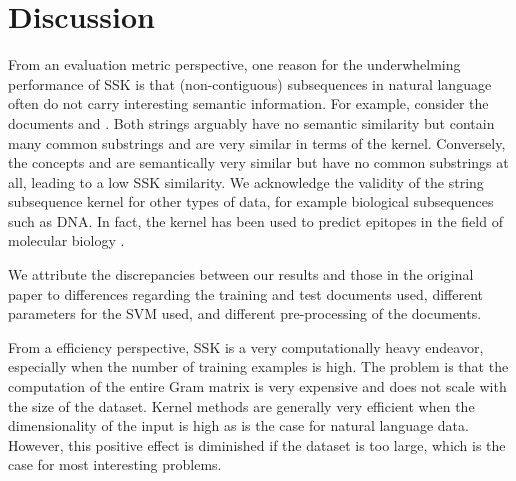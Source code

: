 \section{Discussion} \label{sec:discussion}

From an evaluation metric perspective, one reason for the underwhelming performance of SSK is that (non-contiguous) subsequences in natural language often do not carry interesting semantic information. For example, consider the documents  and . Both strings arguably have no semantic similarity but contain many common substrings and are very similar in terms of the kernel. Conversely, the concepts  and  are semantically very similar but have no common substrings at all, leading to a low SSK similarity. We acknowledge the validity of the string subsequence kernel for other types of data, for example biological subsequences such as DNA. In fact, the kernel has been used to predict epitopes in the field of molecular biology \cite{biology}.

We attribute the discrepancies between our results and those in the original paper to differences regarding the training and test documents used, different parameters for the SVM used, and different pre-processing of the documents. 

From a efficiency perspective, SSK is a very computationally heavy endeavor, especially when the number of training examples is high. The problem is that the computation of the entire Gram matrix is very expensive and does not scale with the size of the dataset. Kernel methods are generally very efficient when the dimensionality of the input is high as is the case for natural language data. However, this positive effect is diminished if the dataset is too large, which is the case for most interesting problems.
